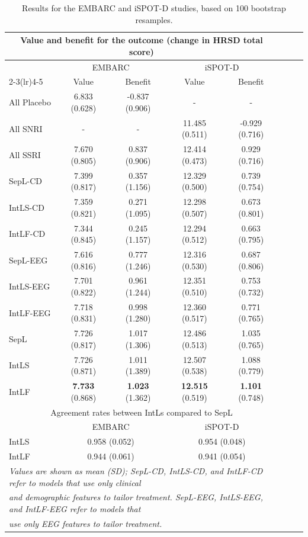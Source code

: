 \documentclass[12pt]{article}
\begin{document}
\begin{table}
    \centering
    \caption{Results for the EMBARC and iSPOT-D studies, based on 100 bootstrap resamples.}
    \label{tab: 2}
    \begin{tabular}{l c c c c c c c}
    \toprule
    \multicolumn{5}{c}{Value and benefit for the outcome (change in HRSD total score)}\\
    \midrule
    & \multicolumn{2}{c}{EMBARC} & \multicolumn{2}{c}{iSPOT-D}\\
    \cmidrule(lr){2-3}\cmidrule(lr){4-5}
    & Value & Benefit & Value & Benefit\\
    \midrule
    All Placebo & 6.833 (0.628) & -0.837 (0.906) & - & -\\
    All SNRI & - & - & 11.485 (0.511) & -0.929 (0.716) \\
    All SSRI & 7.670 (0.805) & 0.837 (0.906)  & 12.414 (0.473) & 0.929 (0.716) \\
    SepL-CD & 7.399 (0.817) & 0.357 (1.156) & 12.329 (0.500) & 0.739 (0.754) \\
    IntLS-CD & 7.359 (0.821) & 0.271 (1.095) & 12.298 (0.507) & 0.673 (0.801)\\
    IntLF-CD & 7.344 (0.845) & 0.245 (1.157) & 12.294 (0.512) & 0.663 (0.795)\\
    SepL-EEG & 7.616 (0.816) & 0.777 (1.246) & 12.316 (0.530) & 0.687 (0.806) \\
    IntLS-EEG & 7.701 (0.822) & 0.961 (1.244) & 12.351 (0.510) & 0.753 (0.732)\\
    IntLF-EEG & 7.718 (0.831) & 0.998 (1.280) & 12.360 (0.517) & 0.771 (0.765)\\
    SepL & 7.726 (0.817) & 1.017 (1.306) & 12.486 (0.513) & 1.035 (0.765) \\
    IntLS & 7.726 (0.871) & 1.011 (1.389) & 12.507 (0.538) & 1.088 (0.779)\\
    IntLF & {\bf 7.733} (0.868) & {\bf 1.023} (1.362) & {\bf 12.515} (0.519) & {\bf 1.101} (0.748)\\
    \bottomrule
    \toprule
    \multicolumn{5}{c}{Agreement rates between IntLs compared to SepL}\\
    \midrule
    & \multicolumn{2}{c}{EMBARC} & \multicolumn{2}{c}{iSPOT-D}\\
    IntLS & \multicolumn{2}{c}{0.958 (0.052)} & \multicolumn{2}{c}{0.954 (0.048)}\\
    IntLF & \multicolumn{2}{c}{0.944 (0.061)} & \multicolumn{2}{c}{0.941 (0.054)} \\
    \bottomrule
    \multicolumn{5}{l}{\footnotesize\textit{Values are shown as mean (SD); SepL-CD, IntLS-CD, and IntLF-CD refer to models that use only clinical }}\\
    \multicolumn{5}{l}{\footnotesize\textit{and  demographic features to tailor treatment. SepL-EEG, IntLS-EEG, and IntLF-EEG refer to models that }}\\
    \multicolumn{5}{l}{\footnotesize\textit{use only EEG features to tailor treatment.}}
    \end{tabular}
\end{table}
\end{document}

